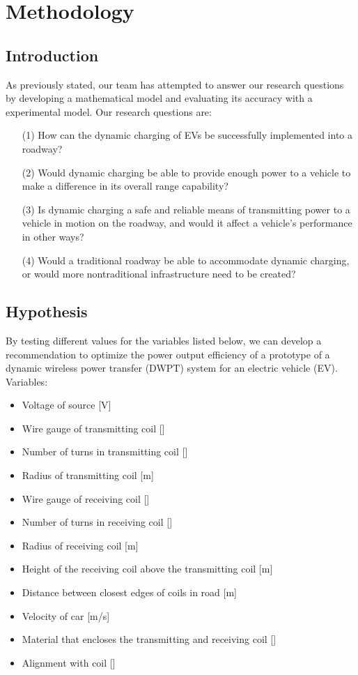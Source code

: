 
\renewcommand{\thechapter}{3}

\chapter{Methodology}

\section{Introduction}
As previously stated, our team has attempted to answer our research questions by developing a mathematical model 
and evaluating its accuracy with a experimental model.  Our research questions are:

\begin{enumerate}
    \item[(1)]
    How can the dynamic charging of EVs be successfully implemented into a roadway?  
    \item[(2)]
    Would dynamic charging be able to provide enough power to a vehicle to make a difference in its overall range capability? 
    \item[(3)]
    Is dynamic charging a safe and reliable means of transmitting power to a vehicle in motion on the roadway, and would it affect a vehicle’s performance in other ways?   
    \item[(4)]
    Would a traditional roadway be able to accommodate dynamic charging, or would more nontraditional infrastructure need to be created?
\end{enumerate}

\section{Hypothesis}
By testing different values for the variables listed below, we can develop a recommendation to optimize the power 
output efficiency of a prototype of a dynamic wireless power transfer (DWPT) system for an electric vehicle (EV).
Variables:
\begin{itemize}
    \item Voltage of source [V]
    \item Wire gauge of transmitting coil []
    \item Number of turns in transmitting coil []
    \item Radius of transmitting coil [m]
    \item Wire gauge of receiving coil []
    \item Number of turns in receiving coil []
    \item Radius of receiving coil [m]
    \item Height of the receiving coil above the transmitting coil [m]
    \item Distance between closest edges of coils in road [m]
    \item Velocity of car [m/s]
    \item Material that encloses the transmitting and receiving coil []
    \item Alignment with coil []
\end{itemize}

